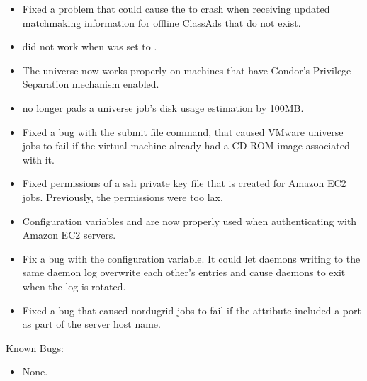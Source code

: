 \begin{itemize}
\item Fixed a problem that could cause the  to crash
when receiving updated matchmaking information for offline ClassAds that do
not exist.

\item {} did not work when
 was set to .

\item The  universe now works properly on machines that 
have Condor's Privilege Separation mechanism enabled.

\item {} no longer pads a  universe job's disk usage
estimation by 100MB.

\item Fixed a bug with the  submit file
command, that caused VMware  universe jobs to fail if the virtual
machine already had a CD-ROM image associated with it.

\item Fixed permissions of a ssh private key file that is created for 
Amazon EC2 jobs. Previously, the permissions were too lax.

\item Configuration variables  and
 are now properly used when authenticating
with Amazon EC2 servers.

\item Fix a bug with the  configuration variable.
It could let daemons writing to the same daemon log overwrite each other's
entries and cause daemons to exit when the log is rotated.

\item Fixed a bug that caused nordugrid jobs to fail if the
 attribute included a port as part of the server
host name.

\end{itemize}

\noindent Known Bugs:

\begin{itemize}

\item None.

\end{itemize}

